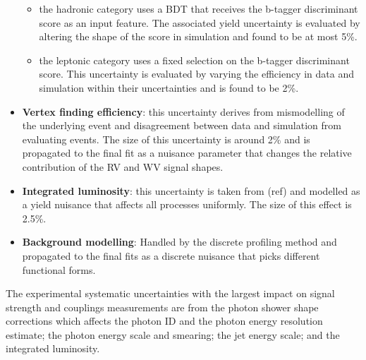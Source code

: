 \begin{itemize}[noitemsep]
{           \begin{itemize}[noitemsep]
               \item[\textbullet] the hadronic category uses a BDT that receives the b-tagger discriminant score as an input feature. The associated yield uncertainty is evaluated by altering the shape of the score in simulation and found to be at most 5\%.
               \item[\textbullet] the leptonic category uses a fixed selection on the b-tagger discriminant score. This uncertainty is evaluated by varying the efficiency in data and simulation within their uncertainties and is found to be 2\%.  
           \end{itemize}
           }
    \item {\textbf{Vertex finding efficiency}: 
           this uncertainty derives from mismodelling of the underlying event and disagreement between data and simulation from evaluating \Zmumu events. The size of this uncertainty is around 2\% and is propagated to the final fit as a nuisance parameter that changes the relative contribution of the RV and WV signal shapes.
           }
    \item {\textbf{Integrated luminosity}: 
        this uncertainty is taken from (ref) and modelled as a yield nuisance that affects all processes uniformly. The size of this effect is 2.5\%.
           }
    \item {\textbf{Background modelling}: 
           Handled by the discrete profiling method and propagated to the final fits as a discrete nuisance that picks different functional forms. 
           }
\end{itemize}

The experimental systematic uncertainties with the largest impact on signal strength and couplings measurements are from the photon shower shape corrections which affects the photon ID and the photon energy resolution estimate; the photon energy scale and smearing; the jet energy scale; and the integrated luminosity.









